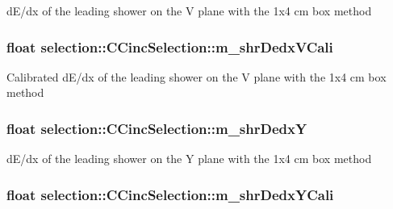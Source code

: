 d\-E/dx of the leading shower on the V plane with the 1x4 cm box method \hypertarget{classselection_1_1CCincSelection_a9c1276e1f839f39c0c36ca5359631863}{
\subsubsection[{m\-\_\-shr\-Dedx\-V\-Cali}]{\setlength{\rightskip}{0pt plus 5cm}float selection\-::\-C\-Cinc\-Selection\-::m\-\_\-shr\-Dedx\-V\-Cali\hspace{0.3cm}{\ttfamily [private]}}}\label{classselection_1_1CCincSelection_a9c1276e1f839f39c0c36ca5359631863}
Calibrated d\-E/dx of the leading shower on the V plane with the 1x4 cm box method \hypertarget{classselection_1_1CCincSelection_aca70f9a6dfad2d0ed4c2ef4c71fe37bd}{
\subsubsection[{m\-\_\-shr\-Dedx\-Y}]{\setlength{\rightskip}{0pt plus 5cm}float selection\-::\-C\-Cinc\-Selection\-::m\-\_\-shr\-Dedx\-Y\hspace{0.3cm}{\ttfamily [private]}}}\label{classselection_1_1CCincSelection_aca70f9a6dfad2d0ed4c2ef4c71fe37bd}
d\-E/dx of the leading shower on the Y plane with the 1x4 cm box method \hypertarget{classselection_1_1CCincSelection_a1b1d664e4bcff3d9e4d10596ca5039d2}{
\subsubsection[{m\-\_\-shr\-Dedx\-Y\-Cali}]{\setlength{\rightskip}{0pt plus 5cm}float selection\-::\-C\-Cinc\-Selection\-::m\-\_\-shr\-Dedx\-Y\-Cali\hspace{0.3cm}{\ttfamily [private]}}}\label{classselection_1_1CCincSelection_a1b1d664e4bcff3d9e4d10596ca5039d2}
